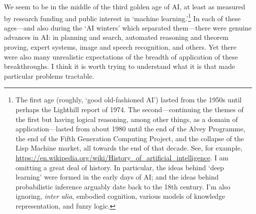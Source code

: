 \documentclass[10pt, a4, twocolumn]{article}
\begin{document}
We seem to be in the middle of the third golden age of AI, at least as measured
by research funding and public interest in `machine learning.'\footnote{The
first age (roughly, `good old-fashioned AI') lasted from the 1950s until perhaps
the Lighthill report of 1974. The second---continuing the themes of the first but
having logical reasoning, among other things, as a domain of application---lasted
from about 1980 until the end of the Alvey Programme, the end of the Fifth
Generation Computing Project, and the collapse of the Lisp Machine market, all
towards the end of that decade. See, for example,
\url{https://en.wikipedia.org/wiki/History_of_artificial_intelligence}. I am
omitting a great deal of history. In particular, the ideas behind `deep
learning' were formed in the early days of AI; and the ideas behind
probabilistic inference arguably date back to the 18th century. I'm also
ignoring, \emph{inter alia}, embodied cognition, various models of knowledge
representation, and fuzzy logic.} In each of these ages---and also during the `AI
winters' which separated them---there were genuine advances in AI: in planning and
search, automated reasoning and theorem proving, expert systems, image and
speech recognition, and others. Yet there were also many unrealistic
expectations of the breadth of application of these breakthroughs. I think it is
worth trying to understand what it is that made particular problems
tractable.
\end{document}
